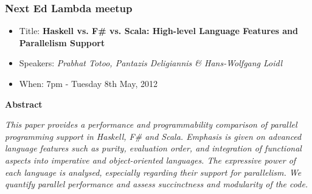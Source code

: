\documentclass{beamer}
\begin{document}
\begin{frame}
\frametitle{Next Ed Lambda meetup}

\begin{itemize}
\item Title: \textbf{Haskell vs. F\# vs. Scala: High-level Language
Features and Parallelism Support}
\item Speakers: \emph{Prabhat Totoo, Pantazis Deligiannis \& Hans-Wolfgang Loidl}
\item When: 7pm - Tuesday 8th May, 2012

\end{itemize}

\textbf{Abstract}

\emph{
This paper provides a performance and programmability comparison of
parallel programming support in Haskell, F\# and Scala. Emphasis is given on advanced language features such as purity,
evaluation order, and integration of functional aspects into
imperative and object-oriented languages. The expressive power of each
language is analysed, especially regarding their support for
parallelism. We quantify parallel performance and assess succinctness
and modularity of the code.
}

\end{frame}
\end{document}
